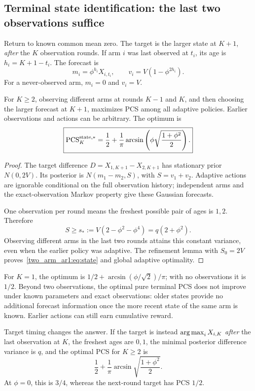 \subsection{Terminal state identification: the last two observations suffice}
Return to known common mean zero. The target is the larger state at $K+1$, \emph{after} the $K$ observation rounds. If arm $i$ was last observed at $t_i$, its age is $h_i=K+1-t_i$. The forecast is
\begin{equation}
m_i=\phi^{h_i}X_{i,t_i},\qquad
v_i=V(1-\phi^{2h_i}).
\end{equation}
For a never-observed arm, $m_i=0$ and $v_i=V$.

\begin{theorem}
For $K\geq2$, observing different arms at rounds $K-1$ and $K$, and then choosing the larger forecast at $K+1$, maximizes PCS among all adaptive policies. Earlier observations and actions can be arbitrary. The optimum is
\begin{equation}
\boxed{\operatorname{PCS}_K^{\mathrm{state},*}
=\frac12+\frac1\pi\arcsin\left(
\phi\sqrt{\frac{1+\phi^2}{2}}\right).}
\label{two_arm_ar1:eq:state}
\end{equation}
\end{theorem}
\begin{proof}
The target difference $D=X_{1,K+1}-X_{2,K+1}$ has stationary prior $N(0,2V)$. Its posterior is $N(m_1-m_2,S)$, with $S=v_1+v_2$. Adaptive actions are ignorable conditional on the full observation history; independent arms and the exact-observation Markov property give these Gaussian forecasts.

One observation per round means the freshest possible pair of ages is $1,2$. Therefore
\[
S\geq s_*:=V(2-\phi^2-\phi^4)=q(2+\phi^2).
\]
Observing different arms in the last two rounds attains this constant variance, even when the earlier policy was adaptive. The refinement lemma with $S_0=2V$ proves~\eqref{two_arm_ar1:eq:state} and global adaptive optimality.
\end{proof}

For $K=1$, the optimum is $1/2+\arcsin(\phi/\sqrt2)/\pi$; with no observations it is $1/2$. Beyond two observations, the optimal pure terminal PCS does not improve under known parameters and exact observations: older states provide no additional forecast information once the more recent state of the same arm is known. Earlier actions can still earn cumulative reward.

Target timing changes the answer. If the target is instead $\operatorname*{arg\,max}_iX_{i,K}$ \emph{after} the last observation at $K$, the freshest ages are $0,1$, the minimal posterior difference variance is $q$, and the optimal PCS for $K\geq2$ is
\begin{equation}
\frac12+\frac1\pi\arcsin\sqrt{\frac{1+\phi^2}{2}}.
\end{equation}
At $\phi=0$, this is $3/4$, whereas the next-round target has PCS $1/2$.

